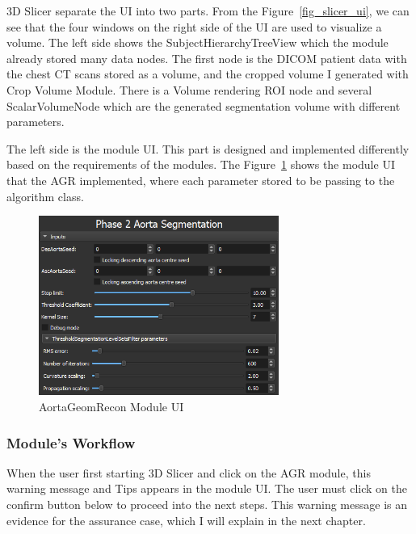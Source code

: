 3D Slicer separate the UI into two parts. From the Figure~\ref{fig_slicer_ui}, we can see that the four windows on the right side of the UI are used to visualize a volume. The left side shows the SubjectHierarchyTreeView which the module already stored many data nodes. The first node is the DICOM patient data with the chest CT scans stored as a volume, and the cropped volume I generated with Crop Volume Module. There is a Volume rendering ROI node and several ScalarVolumeNode which are the generated segmentation volume with different parameters.

The left side is the module UI. This part is designed and implemented differently based on the requirements of the modules. The Figure~\ref{fig_module_ui} shows the module UI that the AGR implemented, where each parameter stored to be passing to the algorithm class.

\begin{figure}[H]
    \centering
    \includegraphics[width=0.7\textwidth]{figures/AGR/Module_UI.png}
    \caption[AortaGeomRecon Module UI]{AortaGeomRecon Module UI}
    \label{fig_module_ui}
\end{figure}


\subsubsection{Module's Workflow} \label{module_workflow}
When the user first starting 3D Slicer and click on the AGR module, this warning message and Tips appears in the module UI. The user must click on the confirm button below to proceed into the next steps. This warning message is an evidence for the assurance case, which I will explain in the next chapter.

